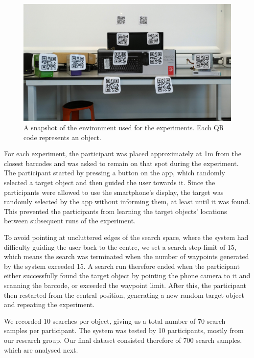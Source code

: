 \documentclass[a4paper, twoside]{article}
\begin{document}
\begin{figure}
  \centering
  \includegraphics[width=\columnwidth]{figures/test_env_picture.jpg}
  \caption{A snapshot of the environment used for the experiments. Each QR code represents an object.}\label{fig:env-picture}
\end{figure}

For each experiment, the participant was placed approximately at 1m from the closest barcodes and was asked to remain on that spot during the experiment. The participant started by pressing a button on the app, which randomly selected a target object and then guided the user towards it. Since the participants were allowed to use the smartphone's display, the target was randomly selected by the app without informing them, at least until it was found. This prevented the participants from learning the target objects' locations between subsequent runs of the experiment.

To avoid pointing at uncluttered edges of the search space, where the system had difficulty guiding the user back to the centre, we set a search step-limit of 15, which means the search was terminated when the number of waypoints generated by the system exceeded 15. A search run therefore ended when the participant either successfully found the target object by pointing the phone camera to it and scanning the barcode, or exceeded the waypoint limit. After this, the participant then restarted from the central position, generating a new random target object and repeating the experiment.

We recorded 10 searches per object, giving us a total number of 70 search samples per participant. The system was tested by 10 participants, mostly from our research group. Our final dataset consisted therefore of 700 search samples, which are analysed next.
\end{document}
